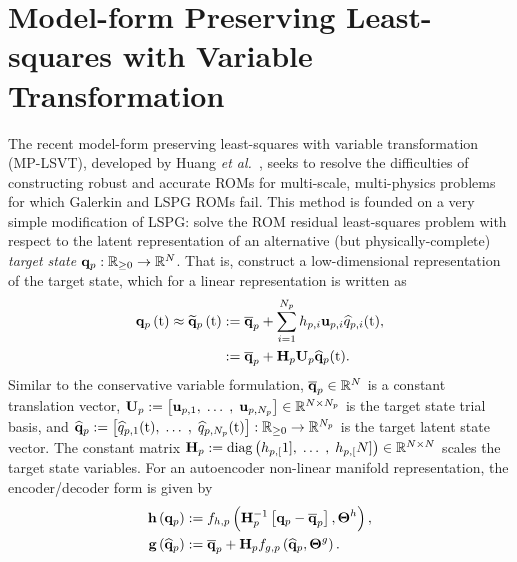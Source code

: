 \section{Model-form Preserving Least-squares with Variable Transformation}\label{sec:mplsvt}

The recent model-form preserving least-squares with variable transformation (MP-LSVT), developed by Huang \textit{et al.}~\cite{Huang2022}, seeks to resolve the difficulties of constructing robust and accurate ROMs for multi-scale, multi-physics problems for which Galerkin and LSPG ROMs fail. This method is founded on a very simple modification of LSPG: solve the ROM residual least-squares problem with respect to the latent representation of an alternative (but physically-complete) \textit{target state} $\mathbf{q}_{p}: \mathbb{R}_{\ge 0} \rightarrow \mathbb{R}^{N}$. That is, construct a low-dimensional representation of the target state, which for a linear representation is written as
%
\begin{equation}\label{eq:primSolApprox}
    \begin{aligned}
        \primFunc{\timeVar} \approx \primFuncRom{\timeVar} &\defEq \primVecCent + \sum_{\dummyIdx=1}^{\numPrimModes} \primScaleVar{\dummyIdx} \primTrialVecIdx \primVarCoefIdx (\timeVar), \\
        &\defEq \primAffineMap(\timeVar).
    \end{aligned}
\end{equation}
%
Similar to the conservative variable formulation, $\mathbf{\overline{q}}_{p} \in \mathbb{R}^{N}$ is a constant translation vector, $\primTrial \defEq \left[\primTrialVec{1}, \; \hdots \;, \; \primTrialVec{\numPrimModes}\right] \inRTwo{\numDOF}{\numPrimModes}$ is the target state trial basis, and $\mathbf{\widehat{q}}_{p} := \left[\widehat{q}_{p,1}(\text{t}), \; \hdots \;, \; \widehat{q}_{p,N_p}(\text{t})\right]: \mathbb{R}_{\ge 0} \rightarrow \mathbb{R}^{N_p}$ is the target latent state vector. The constant matrix $\primScale \defEq \text{diag}\left(\primScaleVar[1], \; \hdots \; , \; \primScaleVar[\numDOF]\right) \inRTwo{\numDOF}{\numDOF}$ scales the target state variables. For an autoencoder non-linear manifold representation, the encoder/decoder form is given by
%
\begin{align}
    \encoderFunc{\primVec} &\defEq \nnLayer_{\encoderVar,\primVar} \left(\primScaleInv\left[\primVec - \primVecCent\right], \nnParams^{\encoderVar}\right), \\
    \decoderFunc{\primVecCoef} &\defEq \primVecCent + \primScale \nnLayer_{\decoderVar,\primVar} \left(\primVecCoef, \nnParams^{\decoderVar}\right). \label{eq:decoderFuncPrim}
\end{align}
